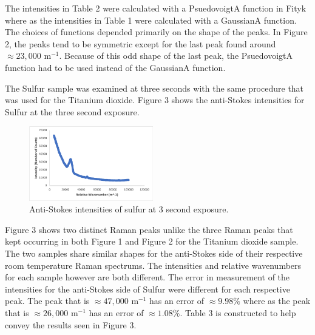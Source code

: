 \documentclass[twocolumn]{article}
\begin{document}
\newline
The intensities in Table 2 were calculated with a PsuedovoigtA function in Fityk where as the intensities in Table 1 were calculated with a GaussianA function. The choices of functions depended primarily on the shape of the peaks. In Figure 2, the peaks tend to be symmetric except for the last peak found around $\approx 23,000$ m$^{-1}$. Because of this odd shape of the last peak, the PsuedovoigtA function had to be used instead of the GaussianA function.

The Sulfur sample was examined at three seconds with the same procedure that was used for the Titanium dioxide. Figure 3 shows the anti-Stokes intensities for Sulfur at the three second exposure.
\begin{figure}[htbp]
\begin{center}
\includegraphics[width=0.48\textwidth]{Figures/PHYS 331 RS S Anti-Stokes Relative Wavenumber.png}
\caption{Anti-Stokes intensities of sulfur at 3 second exposure.}
\label{default}
\end{center}
\end{figure}
\newline
Figure 3 shows two distinct Raman peaks unlike the three Raman peaks that kept occurring in both Figure 1 and Figure 2 for the Titanium dioxide sample. The two samples share similar shapes for the anti-Stokes side of their respective room temperature Raman spectrums. The intensities and relative wavenumbers for each sample however are both different. The error in measurement of the intensities for the anti-Stokes side of Sulfur were different for each respective peak.  The peak that is $\approx 47,000$ m$^{-1}$ has an error of $\approx 9.98\%$ where as the peak that is $\approx 26,000$ m$^{-1}$ has an error of $\approx 1.08\%$. Table 3 is constructed to help convey the results seen in Figure 3. 
\end{document}
